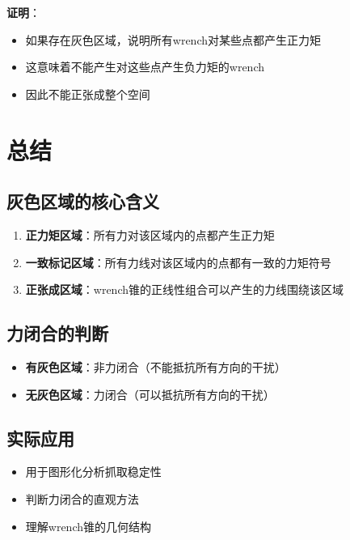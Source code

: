 \documentclass[12pt,a4paper]{article}
\begin{document}
\textbf{证明}：
\begin{itemize}
\item 如果存在灰色区域，说明所有wrench对某些点都产生正力矩
\item 这意味着不能产生对这些点产生负力矩的wrench
\item 因此不能正张成整个空间
\end{itemize}

\section{总结}

\subsection{灰色区域的核心含义}

\begin{enumerate}
\item \textbf{正力矩区域}：所有力对该区域内的点都产生正力矩
\item \textbf{一致标记区域}：所有力线对该区域内的点都有一致的力矩符号
\item \textbf{正张成区域}：wrench锥的正线性组合可以产生的力线围绕该区域
\end{enumerate}

\subsection{力闭合的判断}

\begin{itemize}
\item \textbf{有灰色区域}：非力闭合（不能抵抗所有方向的干扰）
\item \textbf{无灰色区域}：力闭合（可以抵抗所有方向的干扰）
\end{itemize}

\subsection{实际应用}

\begin{itemize}
\item 用于图形化分析抓取稳定性
\item 判断力闭合的直观方法
\item 理解wrench锥的几何结构
\end{itemize}
\end{document}
